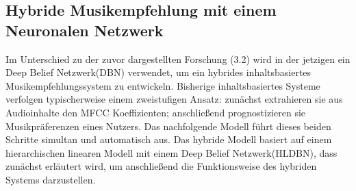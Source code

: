 \documentclass[twosided,a4,10pt]{article}
\begin{document}
\begin{multicols}{2}

		\subsection{Hybride Musikempfehlung mit einem Neuronalen Netzwerk}
		Im Unterschied zu der zuvor dargestellten Forschung (3.2) wird in der jetzigen ein Deep Belief Netzwerk(DBN) verwendet, um ein hybrides inhaltsbasiertes Musikempfehlungssystem zu entwickeln. Bisherige inhaltsbasiertes Systeme verfolgen typischerweise einem zweistufigen Ansatz: zunächst extrahieren sie aus Audioinhalte den MFCC Koeffizienten; anschließend prognostizieren sie Musikpräferenzen eines Nutzers. Das nachfolgende Modell führt dieses beiden Schritte simultan und automatisch aus. \cite{wang}\newline
		Das hybride Modell basiert auf einem hierarchischen linearen Modell mit einem Deep Belief Netzwerk(HLDBN), dass zunächst erläutert wird, um anschließend die Funktionsweise des hybriden Systems darzustellen.
		

\end{multicols}
\end{document}
